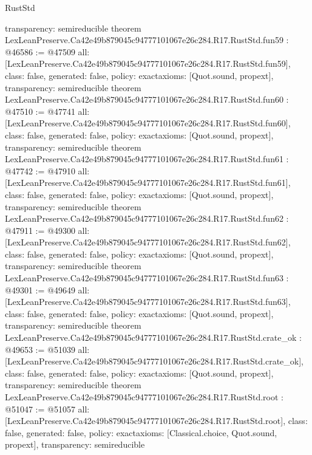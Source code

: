\begin{lexlean}{RustStd}
\begin{coremodule}
{  transparency: semireducible
}
theorem LexLeanPreserve.Ca42e49b879045c94777101067e26c284.R17.RustStd.fun59 : @46586 := @47509 {
  all: [LexLeanPreserve.Ca42e49b879045c94777101067e26c284.R17.RustStd.fun59],
  class: false,
  generated: false,
  policy: exact{axioms: [Quot.sound, propext]},
  transparency: semireducible
}
theorem LexLeanPreserve.Ca42e49b879045c94777101067e26c284.R17.RustStd.fun60 : @47510 := @47741 {
  all: [LexLeanPreserve.Ca42e49b879045c94777101067e26c284.R17.RustStd.fun60],
  class: false,
  generated: false,
  policy: exact{axioms: [Quot.sound, propext]},
  transparency: semireducible
}
theorem LexLeanPreserve.Ca42e49b879045c94777101067e26c284.R17.RustStd.fun61 : @47742 := @47910 {
  all: [LexLeanPreserve.Ca42e49b879045c94777101067e26c284.R17.RustStd.fun61],
  class: false,
  generated: false,
  policy: exact{axioms: [Quot.sound, propext]},
  transparency: semireducible
}
theorem LexLeanPreserve.Ca42e49b879045c94777101067e26c284.R17.RustStd.fun62 : @47911 := @49300 {
  all: [LexLeanPreserve.Ca42e49b879045c94777101067e26c284.R17.RustStd.fun62],
  class: false,
  generated: false,
  policy: exact{axioms: [Quot.sound, propext]},
  transparency: semireducible
}
theorem LexLeanPreserve.Ca42e49b879045c94777101067e26c284.R17.RustStd.fun63 : @49301 := @49649 {
  all: [LexLeanPreserve.Ca42e49b879045c94777101067e26c284.R17.RustStd.fun63],
  class: false,
  generated: false,
  policy: exact{axioms: [Quot.sound, propext]},
  transparency: semireducible
}
theorem LexLeanPreserve.Ca42e49b879045c94777101067e26c284.R17.RustStd.crate_ok : @49653 := @51039 {
  all: [LexLeanPreserve.Ca42e49b879045c94777101067e26c284.R17.RustStd.crate_ok],
  class: false,
  generated: false,
  policy: exact{axioms: [Quot.sound, propext]},
  transparency: semireducible
}
theorem LexLeanPreserve.Ca42e49b879045c94777101067e26c284.R17.RustStd.root : @51047 := @51057 {
  all: [LexLeanPreserve.Ca42e49b879045c94777101067e26c284.R17.RustStd.root],
  class: false,
  generated: false,
  policy: exact{axioms: [Classical.choice, Quot.sound, propext]},
  transparency: semireducible
}


\end{coremodule}
\end{lexlean}
